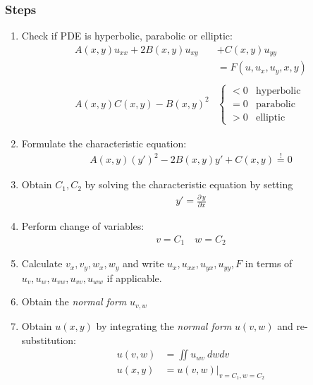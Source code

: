 \subsubsection{Steps}
\begin{enumerate}
    \item Check if PDE is hyperbolic, parabolic or elliptic:
          \begin{align*}
              A(x,y)u_{xx}+2B(x,y)u_{xy} & +C(x,y)u_{yy}          \\
                                         & =F(u,u_x,u_y,x,y)      \\\\
              A(x,y)C(x,y)-{B(x,y)}^2    & \begin{cases}
                                               <0 & \text{hyperbolic} \\
                                               =0 & \text{parabolic}  \\
                                               >0 & \text{elliptic}
                                           \end{cases}
          \end{align*}
    \item Formulate the characteristic equation:
          \begin{align*}
              A(x,y){(y')}^2-2B(x,y)y'+C(x,y)\overset{!}{=} 0
          \end{align*}
    \item Obtain $C_{1},C_{2}$ by solving the characteristic equation by setting
          \begin{align*}
              y'=\frac{\partial\, y}{\partial x}
          \end{align*}
    \item Perform change of variables:
          \begin{align*}
              v = C_{1} \quad w=C_{2}
          \end{align*}
    \item Calculate $v_{x},v_{y},w_{x},w_{y}$
          and write $u_{x},u_{xx},u_{yx},u_{yy},F$ in terms of
          $u_{v},u_{w},u_{vw},u_{vv},u_{ww}$ if applicable.
    \item Obtain the \textit{normal form} $u_{v,w}$
    \item Obtain $u(x,y)$ by integrating the \textit{normal form} $u(v,w)$
          and re-substitution:
          \begin{align*}
              u(v,w) & =\iint u_{wv}\ dw dv        \\
              u(x,y) & =u(v,w)|_{v=C_{1}, w=C_{2}}
          \end{align*}
\end{enumerate}

